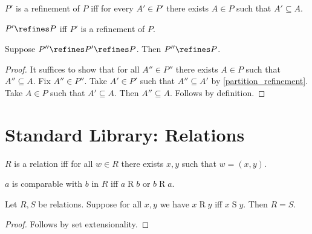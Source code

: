 \begin{definition}\label{partition_refinement}
    $P'$ is a refinement of $P$ iff
    for every $A'\in P'$ there exists
    $A\in P$ such that $A'\subseteq A$.
\end{definition}

\begin{abbreviation}\label{partition_refines}
    $P'\refines P$ iff
    $P'$ is a refinement of $P$.
\end{abbreviation}

\begin{proposition}\label{partition_refinement_transitive}
    Suppose $P''\refines P'\refines P$.
    Then $P''\refines P$.
\end{proposition}
\begin{proof}
    It suffices to show that for all $A''\in P''$ there exists $A\in P$ such that $A''\subseteq A$.
    Fix $A''\in P''$.
    Take $A'\in P'$ such that $A''\subseteq A'$
        by \cref{partition_refinement}.
    Take $A\in P$ such that $A'\subseteq A$.
    Then $A''\subseteq A$.
    Follows by definition. %
\end{proof}



\section{Standard Library: Relations}

\begin{definition}\label{relation}
    $R$ is a relation iff
    for all $w\in R$ there exists $x, y$ such that $w = (x, y)$.
\end{definition}

\begin{definition}\label{comparable}
    $a$ is comparable with $b$ in $R$ iff $a\mathrel{R}b$ or $b\mathrel{R}a$.
\end{definition}

\begin{proposition}\label{relext}
    Let $R, S$ be relations.
    Suppose for all $x,y$ we have $x\mathrel{R} y$ iff $x\mathrel{S} y$.
    Then $R = S$.
\end{proposition}
\begin{proof}
    Follows by set extensionality.
\end{proof}

